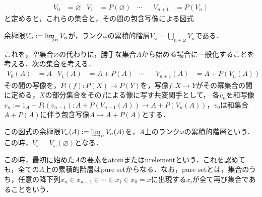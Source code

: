 \documentclass[uplatex, dvipdfmx]{jsarticle}
\begin{document}
\begin{example}
    \begin{align*}
        V_0&=\varnothing & V_1&=P(\varnothing) &\cdots& & V_{n+1}&=P(V_n)
    \end{align*}
    と定めると，これらの集合と，その間の包含写像による図式
    \begin{center}
    \end{center}
    余極限$V_\omega:=\varinjlim_nV_n$が，ランク$\omega$の累積的階層$V_\omega=\bigcup_{n\in\omega}V_n$である．

    これを，空集合$\varnothing$の代わりに，勝手な集合$A$から始める場合に一般化することを考える．次の集合を考える．
    \begin{align*}
        V_0(A)&=A & V_1(A)&=A+P(A) &\cdots& & V_{n+1}(A)&=A+P(V_n(A))
    \end{align*}
    その間の写像を，$P_!(f):P(X)\to P(Y)$を，写像$f:X\to Y$がその冪集合の間に定める，$X$の部分集合をその$f$による像に写す共変関手として，
    各$v_n$を和写像$v_n:=1_A+P_!(v_{n-1}):A+P(V_{n-1}(A))\to A+P(V_n(A))$，$v_0$は和集合$A+P(A)$に伴う包含写像$A\to A+P(A)$とする．
    \begin{center}
    \end{center}
    この図式の余極限$V_\omega(A):=\varinjlim_nV_n(A)$を，$A$上のランク$\omega$の累積的階層という．この時，$V_\omega=V_\omega(\varnothing)$となる．

    この時，最初に始めた$A$の要素をatomまたはurelementという．これを認めても，全ての$A$上の累積的階層はpure setからなる．なお，pure setとは，集合のうち，任意の降下列$x_n\in x_{n-1}\in\cdots\in x_1\in x_0=x$に出現する$x_i$が全て再び集合であることをいう．


\end{example}
\end{document}
